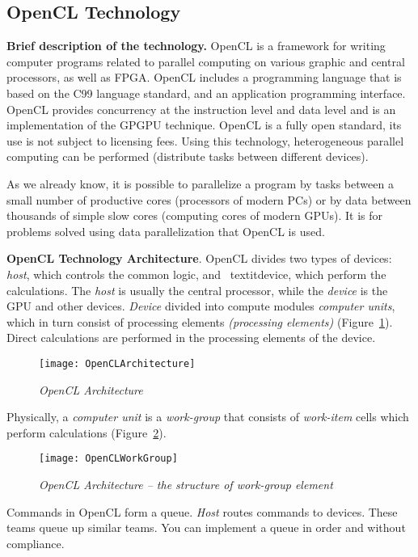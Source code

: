 { %
	\subsection{OpenCL Technology}
	\label{OpenCL:section}
	\par\textbf{Brief description of the technology.} OpenCL is a framework for writing computer programs related to parallel computing on various graphic and central processors, as well as FPGA. OpenCL includes a programming language that is based on the C99 language standard, and an application programming interface. OpenCL provides concurrency at the instruction level and data level and is an implementation of the GPGPU technique. OpenCL is a fully open standard, its use is not subject to licensing fees. Using this technology, heterogeneous parallel computing can be performed (distribute tasks between different devices).
	\par As we already know, it is possible to parallelize a program by tasks between a small number of productive cores (processors of modern PCs) or by data between thousands of simple slow cores (computing cores of modern GPUs). It is for problems solved using data parallelization that OpenCL is used.
	\par\textbf{OpenCL Technology Architecture}. OpenCL divides two types of devices: \textit{host}, which controls the common logic, and \ textit{device}, which perform the calculations. The \textit{host} is usually the central processor, while the \textit{device} is the GPU and other devices. \textit{Device} divided into compute modules \textit{computer units}, which in turn consist of processing elements \textit{(processing elements)} (Figure~\ref{OpenCLArchitecture:image}). Direct calculations are performed in the processing elements of the device.
	\begin{figure}[H]
		\texttt{[image: OpenCLArchitecture]}
		\caption{\textit{OpenCL Architecture}}
		\label{OpenCLArchitecture:image}
	\end{figure}
	\par Physically, a \textit{computer unit} is a \textit{work-group} that consists of \textit{work-item} cells which perform calculations (Figure~\ref{OpenCLWorkGroup:image}).
	\begin{figure}[H]
		\texttt{[image: OpenCLWorkGroup]}
		\caption{\textit{OpenCL  Architecture – the structure of work-group element}}
		\label{OpenCLWorkGroup:image}
	\end{figure}
	\par Commands in OpenCL form a queue. \textit {Host} routes commands to devices. These teams queue up similar teams. You can implement a queue in order and without compliance.
}

